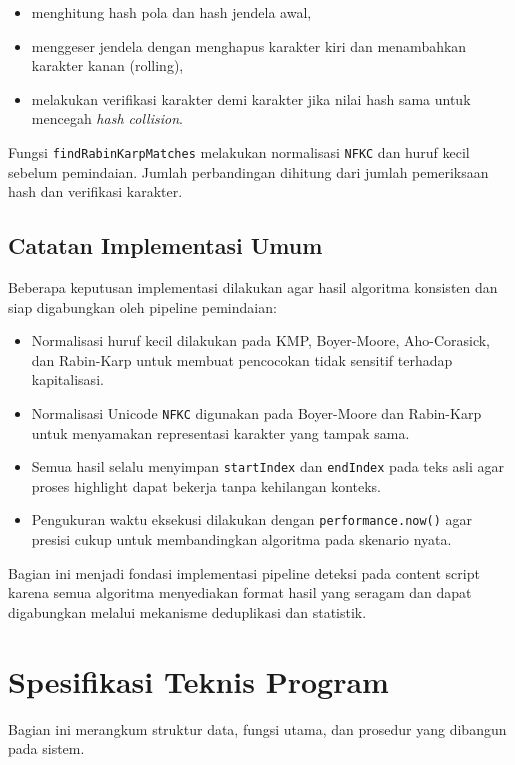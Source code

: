 \begin{itemize}
	\item menghitung hash pola dan hash jendela awal,
	\item menggeser jendela dengan menghapus karakter kiri dan menambahkan
	karakter kanan (rolling),
	\item melakukan verifikasi karakter demi karakter jika nilai hash sama
	untuk mencegah \textit{hash collision}.
\end{itemize}

Fungsi \texttt{findRabinKarpMatches} melakukan normalisasi \texttt{NFKC} dan
huruf kecil sebelum pemindaian. Jumlah perbandingan dihitung dari jumlah
pemeriksaan hash dan verifikasi karakter.

\subsection{Catatan Implementasi Umum}

Beberapa keputusan implementasi dilakukan agar hasil algoritma konsisten dan
siap digabungkan oleh pipeline pemindaian:

\begin{itemize}
	\item Normalisasi huruf kecil dilakukan pada KMP, Boyer-Moore,
	Aho-Corasick, dan Rabin-Karp untuk membuat pencocokan tidak sensitif
	terhadap kapitalisasi.
	\item Normalisasi Unicode \texttt{NFKC} digunakan pada Boyer-Moore dan
	Rabin-Karp untuk menyamakan representasi karakter yang tampak sama.
	\item Semua hasil selalu menyimpan \texttt{startIndex} dan \texttt{endIndex}
	pada teks asli agar proses highlight dapat bekerja tanpa kehilangan
	konteks.
	\item Pengukuran waktu eksekusi dilakukan dengan \texttt{performance.now()}
	agar presisi cukup untuk membandingkan algoritma pada skenario nyata.
\end{itemize}

Bagian ini menjadi fondasi implementasi pipeline deteksi pada content script
karena semua algoritma menyediakan format hasil yang seragam dan dapat
digabungkan melalui mekanisme deduplikasi dan statistik.

\section{Spesifikasi Teknis Program}

Bagian ini merangkum struktur data, fungsi utama, dan prosedur yang dibangun
pada sistem.

